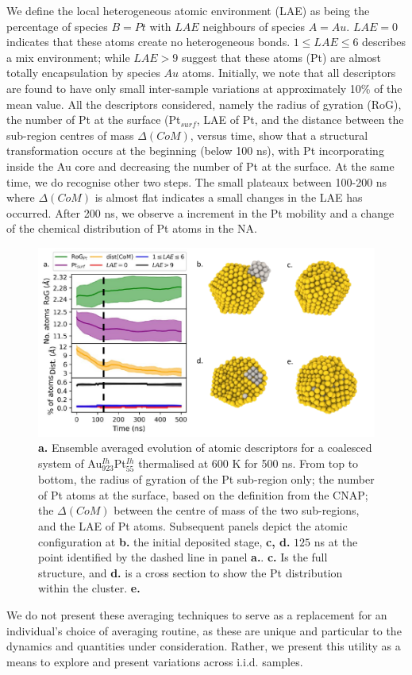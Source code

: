 We define the local heterogeneous atomic environment (LAE) as being the percentage of species $B=Pt$ with $LAE$ neighbours of species $A=Au$. $LAE=0$ indicates that these atoms create no heterogeneous bonds. 
%
$1 \leq LAE \leq 6$ describes a mix environment; while $LAE>9$ suggest that these atoms (Pt) are almost totally encapsulation by species $Au$ atoms.
%
Initially, we note that all descriptors are found to have only small inter-sample variations at approximately 10\% of the mean value. 
All the descriptors considered, namely the radius of gyration (RoG), the number of Pt at the surface (Pt$_{surf}$, LAE of Pt, and the distance between the sub-region centres of mass $\Delta(CoM)$, versus time, show that a structural transformation occurs at the beginning (below 100 ns), with Pt incorporating inside the Au core and decreasing the number of Pt at the surface. At the same time, we do recognise other two steps.
The small plateaux between 100-200 ns where $\Delta(CoM)$ is almost flat indicates a small changes in the LAE has occurred. After 200 ns, we observe a increment in the Pt mobility and a change of the chemical distribution of Pt atoms in the NA.

\begin{figure}[ht!]
\includegraphics[width=16cm]{figures/Sapphire/Sapphir_Avg.pdf}
\caption{\textbf{a.} Ensemble averaged evolution of atomic descriptors for a coalesced system of Au$_{923}^{Ih}$Pt$_{55}^{Ih}$ thermalised at 600 K for 500 ns. From top to bottom, the radius of gyration of the Pt sub-region only; the number of Pt atoms at the surface, based on the definition from the CNAP; the $\Delta(CoM)$ between the centre of mass of the two sub-regions, and the LAE of Pt atoms. Subsequent panels depict the atomic configuration at \textbf{b.} the initial deposited stage, \textbf{c, d.} $125$ ns at the point identified by the dashed line in panel \textbf{a.}. \textbf{c.} Is the full structure, and \textbf{d.} is a cross section to show the Pt distribution within the cluster. \textbf{e.} }
\label{fig:ens-avg}
\end{figure}
We do not present these averaging techniques to serve as a replacement for an individual's choice of averaging routine, as these are unique and particular to the dynamics and quantities under consideration. Rather, we present this utility as a means to explore and present variations across i.i.d. samples.

